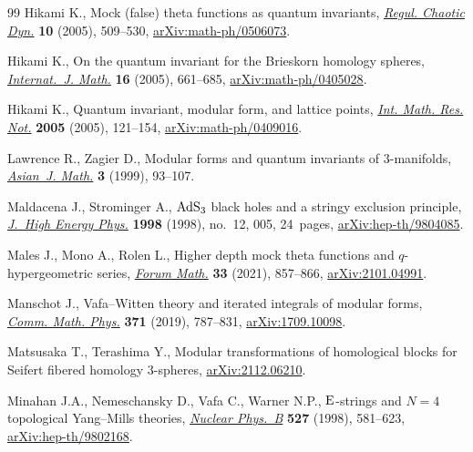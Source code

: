 \documentclass[10pt,a4paper]{amsart}
\theoremstyle{definition}
\numberwithin{equation}{section}
\begin{document}
\begin{thebibliography}{99}
Hikami K., Mock (false) theta functions as quantum invariants, \href{https://doi.org/10.1070/RD2005v010n04ABEH000328}{\textit{Regul.
 Chaotic Dyn.}} \textbf{10} (2005), 509--530, \href{https://arxiv.org/abs/math-ph/0506073}{arXiv:math-ph/0506073}.

Hikami K., On the quantum invariant for the {B}rieskorn homology spheres,
 \href{https://doi.org/10.1142/S0129167X05003004}{\textit{Internat.~J. Math.}} \textbf{16} (2005), 661--685,
 \href{https://arxiv.org/abs/math-ph/0405028}{arXiv:math-ph/0405028}.

Hikami K., Quantum invariant, modular form, and lattice points, \href{https://doi.org/10.1155/IMRN.2005.121}{\textit{Int.
 Math. Res. Not.}} \textbf{2005} (2005), 121--154, \href{https://arxiv.org/abs/math-ph/0409016}{arXiv:math-ph/0409016}.

Lawrence R., Zagier D., Modular forms and quantum invariants of
 {$3$}-manifolds, \href{https://doi.org/10.4310/AJM.1999.v3.n1.a5}{\textit{Asian~J. Math.}} \textbf{3} (1999), 93--107.

Maldacena J., Strominger A., {${\rm AdS}_3$} black holes and a stringy
 exclusion principle, \href{https://doi.org/10.1088/1126-6708/1998/12/005}{\textit{J.~High Energy Phys.}} \textbf{1998} (1998),
 no.~12, 005, 24~pages, \href{https://arxiv.org/abs/hep-th/9804085}{arXiv:hep-th/9804085}.

Males J., Mono A., Rolen L., Higher depth mock theta functions and
 {$q$}-hypergeometric series, \href{https://doi.org/10.1515/forum-2021-0013}{\textit{Forum Math.}} \textbf{33} (2021),
 857--866, \href{https://arxiv.org/abs/2101.04991}{arXiv:2101.04991}.

Manschot J., Vafa--{W}itten theory and iterated integrals of modular forms,
 \href{https://doi.org/10.1007/s00220-019-03389-5}{\textit{Comm. Math. Phys.}} \textbf{371} (2019), 787--831,
 \href{https://arxiv.org/abs/1709.10098}{arXiv:1709.10098}.

Matsusaka T., Terashima Y., Modular transformations of homological blocks for
 {S}eifert fibered homology $3$-spheres, \href{https://arxiv.org/abs/2112.06210}{arXiv:2112.06210}.

Minahan J.A., Nemeschansky D., Vafa C., Warner N.P., {${\rm E}$}-strings and
 {$N=4$} topological {Y}ang--{M}ills theories, \href{https://doi.org/10.1016/S0550-3213(98)00426-X}{\textit{Nuclear Phys.~B}}
 \textbf{527} (1998), 581--623, \href{https://arxiv.org/abs/hep-th/9802168}{arXiv:hep-th/9802168}.


\end{thebibliography}
\end{document}
